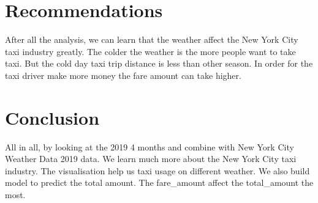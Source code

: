 \documentclass[11pt]{article}
\begin{document}
\section{Recommendations}
After all the analysis, we can learn that the weather affect the New York City taxi industry greatly. The colder the weather is the more people want to take taxi. But the cold day taxi trip distance is less than other season. In order for the taxi driver make more money the fare amount can take higher. 

\section{Conclusion}
All in all, by looking at the 2019 4 months and combine with New York City Weather Data 2019 data. We learn much more about the New York City taxi industry. The visualisation help us taxi usage on different weather. We also build model to predict the total amount. The fare\_amount affect the total\_amount the most.


\clearpage

\printbibliography
\end{document}
